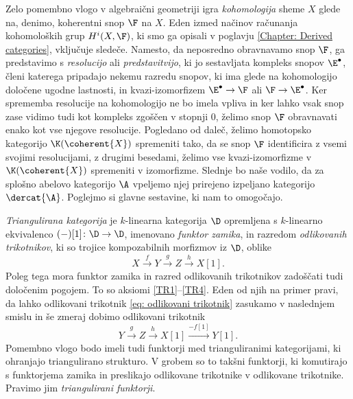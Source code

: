Zelo pomembno vlogo v algebraični geometriji igra \emph{kohomologija} sheme $X$ glede na, denimo, koherentni snop $\F$ na $X$. Eden izmed načinov računanja kohomoloških grup $H^i(X, \F)$, ki smo ga opisali v poglavju \ref{Chapter: Derived categories}, vključuje sledeče. 
Namesto, da 
neposredno obravnavamo snop $\F$, ga predstavimo s \ti \emph{resolucijo} ali \emph{predstavitvijo}, ki jo sestavljata kompleks snopov $\E^\bullet$, členi katerega pripadajo nekemu razredu snopov, ki ima glede na kohomologijo določene ugodne lastnosti, in kvazi-izomorfizem $\E^\bullet \to \F$ ali $\F \to \E^\bullet$. Ker sprememba resolucije na kohomologijo ne bo imela vpliva in ker lahko vsak snop zase vidimo tudi kot kompleks zgoščen v stopnji $0$, želimo snop $\F$ obravnavati enako kot vse njegove resolucije. 
Pogledano od daleč, želimo homotopsko kategorijo $\K(\coherent{X})$ spremeniti tako, da se snop $\F$ identificira z vsemi svojimi resolucijami, \oz z drugimi besedami, želimo vse kvazi-izomorfizme v $\K(\coherent{X})$ spremeniti v izomorfizme. Slednje bo naše vodilo, da za splošno abelovo kategorijo $\A$ vpeljemo njej prirejeno izpeljano kategorijo $\dercat{\A}$. Poglejmo si glavne sestavine, ki nam to omogočajo. 



\emph{Triangulirana kategorija} je $k$-linearna kategorija $\D$ opremljena s $k$-linearno ekvivalenco $(-)[1] \colon \D \to \D$, imenovano \emph{funktor zamika}, in razredom \emph{odlikovanih trikotnikov}, ki so trojice kompozabilnih morfizmov iz $\D$, oblike
\begin{equation}
    \label{eq: odlikovani trikotnik}
    X\xrightarrow{\ f \ } Y \xrightarrow{\ g \ } Z \xrightarrow{\ h \ } X[1].
\end{equation}
Poleg tega mora funktor zamika in razred odlikovanih trikotnikov zadoščati tudi določenim pogojem. To so aksiomi \ref{TR1}--\ref{TR4}. Eden od njih na primer pravi, da lahko odlikovani trikotnik \eqref{eq: odlikovani trikotnik} zasukamo v naslednjem smislu in še zmeraj dobimo odlikovani trikotnik
\[
    Y \xrightarrow{\ g \ } Z \xrightarrow{\ h \ } X[1] \xrightarrow{-f[1]} Y[1].
\]
Pomembno vlogo bodo imeli tudi funktorji med trianguliranimi kategorijami, ki ohranjajo triangulirano strukturo. V grobem so to takšni funktorji, ki komutirajo s funktorjema zamika in preslikajo odlikovane trikotnike v odlikovane trikotnike. Pravimo jim \emph{triangulirani funktorji}.


